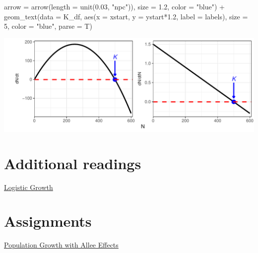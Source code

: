 \documentclass[
]{book}
\newenvironment{Shaded}{\begin{snugshade}}{\end{snugshade}}
\newcommand{\AttributeTok}[1]{\textcolor[rgb]{0.77,0.63,0.00}{#1}}
\newcommand{\DecValTok}[1]{\textcolor[rgb]{0.00,0.00,0.81}{#1}}
\newcommand{\FloatTok}[1]{\textcolor[rgb]{0.00,0.00,0.81}{#1}}
\newcommand{\FunctionTok}[1]{\textcolor[rgb]{0.00,0.00,0.00}{#1}}
\newcommand{\NormalTok}[1]{#1}
\newcommand{\SpecialCharTok}[1]{\textcolor[rgb]{0.00,0.00,0.00}{#1}}
\newcommand{\StringTok}[1]{\textcolor[rgb]{0.31,0.60,0.02}{#1}}
\begin{document}
\begin{Shaded}
\begin{Highlighting}[]
               \AttributeTok{arrow =} \FunctionTok{arrow}\NormalTok{(}\AttributeTok{length =} \FunctionTok{unit}\NormalTok{(}\FloatTok{0.03}\NormalTok{, }\StringTok{"npc"}\NormalTok{)), }
               \AttributeTok{size =} \FloatTok{1.2}\NormalTok{,}
               \AttributeTok{color =} \StringTok{"blue"}\NormalTok{) }\SpecialCharTok{+} 
  \FunctionTok{geom\_text}\NormalTok{(}\AttributeTok{data =}\NormalTok{ K\_df, }
            \FunctionTok{aes}\NormalTok{(}\AttributeTok{x =}\NormalTok{ xstart, }\AttributeTok{y =}\NormalTok{ ystart}\SpecialCharTok{*}\FloatTok{1.2}\NormalTok{, }\AttributeTok{label =}\NormalTok{ labels),}
            \AttributeTok{size =} \DecValTok{5}\NormalTok{, }
            \AttributeTok{color =} \StringTok{"blue"}\NormalTok{,}
            \AttributeTok{parse =}\NormalTok{ T)}
\end{Highlighting}
\end{Shaded}

\begin{center}\includegraphics[width=0.95\linewidth]{03_Week_3_files/figure-latex/unnamed-chunk-3-1} \end{center}

\hypertarget{additional-readings-2}{%
\section*{Additional readings}\label{additional-readings-2}}

\href{http://equation-of-the-month.blogspot.com/2012/01/logistic-growth.html}{Logistic Growth}

\hypertarget{assignments-2}{%
\section*{Assignments}\label{assignments-2}}

\href{./Assignments/Week3_Logistic\%20Growth.pdf}{Population Growth with Allee Effects}
\end{document}
